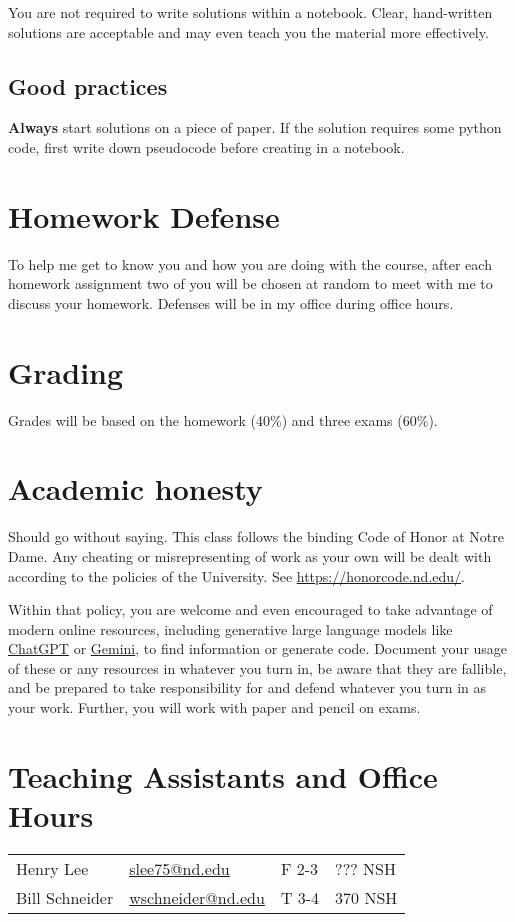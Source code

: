 \documentclass[11pt]{article}
\begin{document}
You are not required to write solutions within a notebook. Clear, hand-written solutions are acceptable and may even teach you the material more effectively.
\subsection{Good practices}
\label{sec:orgd028f2f}
\textbf{Always} start solutions on a piece of paper. If the solution requires some python code, first write down pseudocode before creating in a notebook. 
\section{Homework Defense}
\label{sec:orgcc044be}
To help me get to know you and how you are doing with the course, after each homework assignment two of you will be chosen at random to meet with me to discuss your homework. Defenses will be in my office during office hours.
\section{Grading}
\label{sec:orgcddcbdb}
Grades will be based on the homework (40\%) and three exams (60\%).
\section{Academic honesty}
\label{sec:org21d38d1}
Should go without saying. This class follows the binding Code of Honor at Notre Dame.  Any cheating or misrepresenting of work as your own will be dealt with according to the policies of the University.  See \url{https://honorcode.nd.edu/}.

Within that policy, you are welcome and even encouraged to take advantage of modern online resources, including generative large language models like \href{https://chatgpt.comm}{ChatGPT} or \href{https://gemini.google.com/app}{Gemini}, to find information or generate code. Document your usage of these or any resources in whatever you turn in, be aware that they are fallible, and be prepared to take responsibility for and defend whatever you turn in as your work. Further, you will work with paper and pencil on exams.
\section{Teaching Assistants and Office Hours}
\label{sec:org25beee5}

\begin{center}
\begin{tabular}{llll}
Henry Lee & \href{mailto:slee75@nd.edu}{slee75@nd.edu} & F 2-3 & ??? NSH\\
Bill Schneider & \href{mailto:wschneider@nd.edu}{wschneider@nd.edu} & T 3-4 & 370 NSH\\
\end{tabular}
\end{center}
\end{document}

